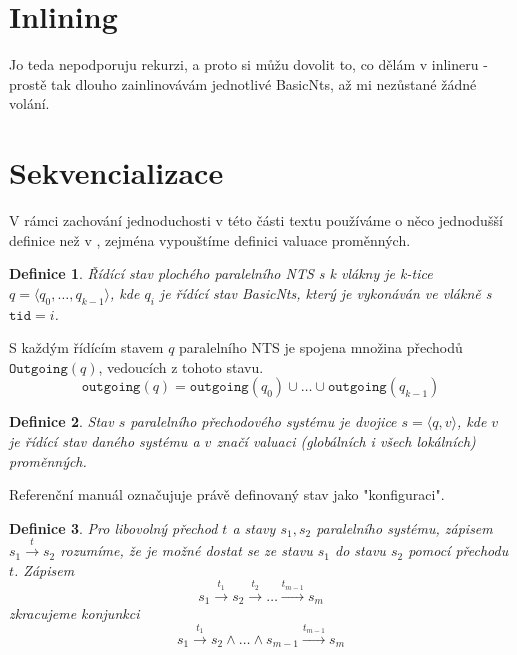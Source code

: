\documentclass[10pt,a4paper,notitlepage]{report}
\newtheorem{definition}{Definice}
\newcommand{\tuple}[1]{\langle #1 \rangle}
\begin{document}
\section{Inlining}
Jo teda nepodporuju rekurzi, a proto si můžu dovolit to, co dělám v inlineru - prostě tak dlouho zainlinovávám jednotlivé BasicNts, až mi nezůstané žádné volání.

\section{Sekvencializace}
V rámci zachování jednoduchosti v této části textu používáme o něco jednodušší definice než v \cite{NTSref}, zejména vypouštíme definici valuace proměnných.

\begin{definition}
Řídící stav plochého paralelního NTS s k vlákny je k-tice $q = \tuple{q_0, \ldots, q_{k-1}}$, kde $q_i$ je řídící stav BasicNts, který je vykonáván ve vlákně s $\texttt{tid} = i$.
\end{definition}
S každým řídícím stavem $q$ paralelního NTS je spojena množina přechodů $\texttt{Outgoing}(q)$, vedoucích z tohoto stavu.
\begin{equation}
\texttt{outgoing}(q) = \texttt{outgoing}(q_0) \cup \ldots \cup \texttt{outgoing}(q_{k-1})
\end{equation}

\begin{definition}
Stav $s$ paralelního přechodového systému je dvojice $s = \tuple{q, v}$, kde $v$ je řídící stav daného systému a $v$ značí valuaci (globálních i všech lokálních) proměnných.
\end{definition}
Referenční manuál označujuje právě definovaný stav jako "konfiguraci".

\begin{definition}
Pro libovolný přechod $t$ a stavy $s_1, s_2$ paralelního systému, zápisem $s_1 \xrightarrow{t} s_2$ rozumíme, že je možné dostat se ze stavu $s_1$ do stavu $s_2$ pomocí přechodu $t$. Zápisem
\begin{equation*}
s_1 \xrightarrow{t_1} s_2 \xrightarrow{t_2} \ldots \xrightarrow{t_{m-1}} s_m
\end{equation*}
zkracujeme konjunkci
\begin{equation*}
s_1 \xrightarrow{t_1} s_2 \land \ldots \land s_{m-1} \xrightarrow{t_{m-1}} s_m
\end{equation*}
\end{definition}
\end{document}
